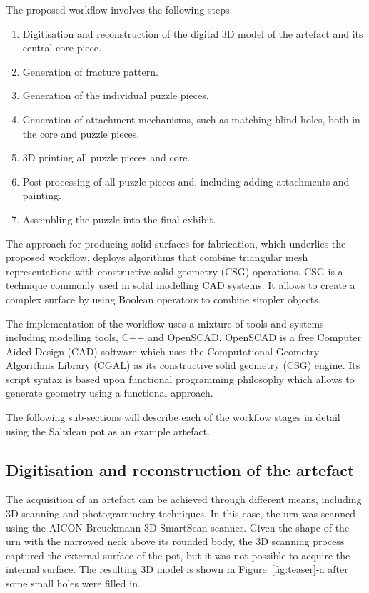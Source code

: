 \documentclass[acmlarge,screen,dvipsnames]{acmart}
\begin{document}
The proposed workflow involves the following steps:
%
\begin{enumerate}
\item Digitisation and reconstruction of the digital 3D model of the artefact and its central core piece.
\item Generation of fracture pattern.
\item Generation of the individual puzzle pieces.
\item Generation of attachment mechanisms, such as matching blind holes, both in the core and puzzle pieces.
\item 3D printing all puzzle pieces and core.
\item Post-processing of all puzzle pieces and, including adding attachments and painting.
\item Assembling the puzzle into the final exhibit.
\end{enumerate}
%

The approach for producing solid surfaces for fabrication, which
underlies the proposed workflow, deploys algorithms that combine
triangular mesh representations with constructive solid geometry (CSG)
operations. CSG is a technique commonly used in solid modelling CAD
systems. It allows to create a complex surface by using Boolean
operators to combine simpler objects.

The implementation of the workflow uses a mixture of tools and systems
including modelling tools, C++ and OpenSCAD. OpenSCAD is a free
Computer Aided Design (CAD) software which uses the Computational
Geometry Algorithms Library (CGAL) \cite{cgal:eb-14a} as its constructive solid geometry
(CSG) engine. Its script syntax is based upon functional programming
philosophy which allows to generate geometry using a functional
approach.

The following sub-sections will describe each of the workflow stages
in detail using the Saltdean pot as an example artefact.

\subsection{Digitisation and reconstruction of the artefact}

The acquisition of an artefact can be achieved through different
means, including 3D scanning and photogrammetry techniques. In this
case, the urn was scanned using the AICON Breuckmann 3D SmartScan
scanner. Given the shape of the urn with the narrowed neck above its
rounded body, the 3D scanning process captured the external surface of
the pot, but it was not possible to acquire the internal surface. The
resulting 3D model is shown in Figure~\ref{fig:teaser}-a after some
small holes were filled in.
\end{document}
